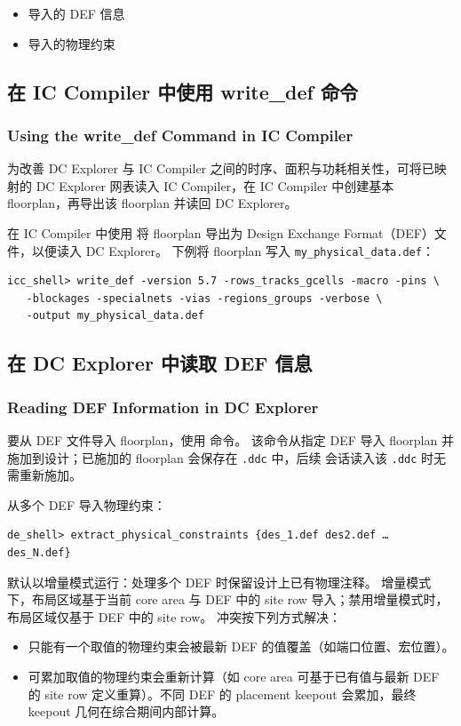 \begin{seeAlsoBox}
\begin{itemize}
  \item 导入的 DEF 信息
  \item 导入的物理约束
\end{itemize}
\end{seeAlsoBox}

\subsection{在 IC Compiler 中使用 write\_def 命令}
\subsubsection*{Using the write\_def Command in IC Compiler}

为改善 DC Explorer 与 IC Compiler 之间的时序、面积与功耗相关性，可将已映射的 DC Explorer 网表读入 IC Compiler，在 IC Compiler 中创建基本 floorplan，再导出该 floorplan 并读回 DC Explorer。

在 IC Compiler 中使用  将 floorplan 导出为 Design Exchange Format（DEF）文件，以便读入 DC Explorer。
下例将 floorplan 写入 \texttt{my\_physical\_data.def}：
\begin{lstlisting}
icc_shell> write_def -version 5.7 -rows_tracks_gcells -macro -pins \
   -blockages -specialnets -vias -regions_groups -verbose \
   -output my_physical_data.def
\end{lstlisting}

\subsection{在 DC Explorer 中读取 DEF 信息}
\subsubsection*{Reading DEF Information in DC Explorer}

要从 DEF 文件导入 floorplan，使用  命令。
该命令从指定 DEF 导入 floorplan 并施加到设计；已施加的 floorplan 会保存在 \texttt{.ddc} 中，后续  会话读入该 \texttt{.ddc} 时无需重新施加。

从多个 DEF 导入物理约束：
\begin{lstlisting}
de_shell> extract_physical_constraints {des_1.def des2.def … des_N.def}
\end{lstlisting}

默认以增量模式运行：处理多个 DEF 时保留设计上已有物理注释。
增量模式下，布局区域基于当前 core area 与 DEF 中的 site row 导入；禁用增量模式时，布局区域仅基于 DEF 中的 site row。
冲突按下列方式解决：
\begin{itemize}
  \item 只能有一个取值的物理约束会被最新 DEF 的值覆盖（如端口位置、宏位置）。
  \item 可累加取值的物理约束会重新计算（如 core area 可基于已有值与最新 DEF 的 site row 定义重算）。不同 DEF 的 placement keepout 会累加，最终 keepout 几何在综合期间内部计算。
\end{itemize}

